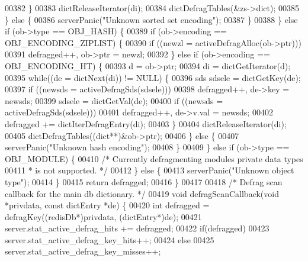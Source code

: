 \begin{DoxyCode}
00382             \}
00383             dictReleaseIterator(di);
00384             dictDefragTables(&zs->dict);
00385         \} \textcolor{keywordflow}{else} \{
00386             serverPanic(\textcolor{stringliteral}{"Unknown sorted set encoding"});
00387         \}
00388     \} \textcolor{keywordflow}{else} \textcolor{keywordflow}{if} (ob->type == OBJ\_HASH) \{
00389         \textcolor{keywordflow}{if} (ob->encoding == OBJ\_ENCODING\_ZIPLIST) \{
00390             \textcolor{keywordflow}{if} ((newzl = activeDefragAlloc(ob->ptr)))
00391                 defragged++, ob->ptr = newzl;
00392         \} \textcolor{keywordflow}{else} \textcolor{keywordflow}{if} (ob->encoding == OBJ\_ENCODING\_HT) \{
00393             d = ob->ptr;
00394             di = dictGetIterator(d);
00395             \textcolor{keywordflow}{while}((de = dictNext(di)) != NULL) \{
00396                 sds sdsele = dictGetKey(de);
00397                 \textcolor{keywordflow}{if} ((newsds = activeDefragSds(sdsele)))
00398                     defragged++, de->key = newsds;
00399                 sdsele = dictGetVal(de);
00400                 \textcolor{keywordflow}{if} ((newsds = activeDefragSds(sdsele)))
00401                     defragged++, de->v.val = newsds;
00402                 defragged += dictIterDefragEntry(di);
00403             \}
00404             dictReleaseIterator(di);
00405             dictDefragTables((dict**)&ob->ptr);
00406         \} \textcolor{keywordflow}{else} \{
00407             serverPanic(\textcolor{stringliteral}{"Unknown hash encoding"});
00408         \}
00409     \} \textcolor{keywordflow}{else} \textcolor{keywordflow}{if} (ob->type == OBJ\_MODULE) \{
00410         \textcolor{comment}{/* Currently defragmenting modules private data types}
00411 \textcolor{comment}{         * is not supported. */}
00412     \} \textcolor{keywordflow}{else} \{
00413         serverPanic(\textcolor{stringliteral}{"Unknown object type"});
00414     \}
00415     \textcolor{keywordflow}{return} defragged;
00416 \}
00417 
00418 \textcolor{comment}{/* Defrag scan callback for the main db dictionary. */}
00419 \textcolor{keywordtype}{void} defragScanCallback(\textcolor{keywordtype}{void} *privdata, \textcolor{keyword}{const} dictEntry *de) \{
00420     \textcolor{keywordtype}{int} defragged = defragKey((redisDb*)privdata, (dictEntry*)de);
00421     server.stat\_active\_defrag\_hits += defragged;
00422     \textcolor{keywordflow}{if}(defragged)
00423         server.stat\_active\_defrag\_key\_hits++;
00424     \textcolor{keywordflow}{else}
00425         server.stat\_active\_defrag\_key\_misses++;

\end{DoxyCode}
